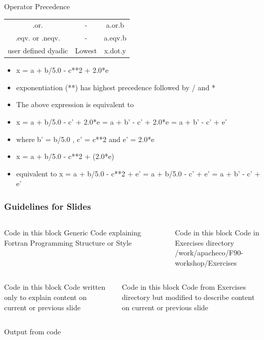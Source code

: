 \documentclass[slidestop,mathserif,compress,xcolor=svgnames]{beamer}
\newenvironment{bblock}[0]
{
\begin{beamerboxesrounded}[upper=uppercol1,lower=lowercol1,shadow=true]}
{\end{beamerboxesrounded}}
\newenvironment{eblock}[0]
{
\begin{beamerboxesrounded}[upper=uppercol2,lower=lowercol2,shadow=true]}
{\end{beamerboxesrounded}}
\newenvironment{beblock}[0]
{
\begin{beamerboxesrounded}[upper=uppercol3,lower=lowercol3,shadow=true]}
{\end{beamerboxesrounded}}
\newenvironment{eeblock}[0]
{
\begin{beamerboxesrounded}[upper=uppercol4,lower=lowercol4,shadow=true]}
{\end{beamerboxesrounded}}
\begin{document}
\begin{frame}[allowframebreaks]
\begin{block}{{\scriptsize Operator Precedence}}
\begin{center}
{\begin{tabular}{ccc}
        .or. & - & a.or.b \\
        .eqv. or .neqv. & - & a.eqv.b \\
        user defined dyadic & Lowest & x.dot.y\\
        \hline
      \end{tabular}
      }
    \end{center}
  \end{block}
  \begin{block}{}
    {\tiny
    \begin{itemize}
      \item x = a + b/5.0 - c**2 + 2.0*e
      \item[] exponentiation (**) has highest precedence followed by / and *
      \item The above expression is equivalent to
      \item x = a + b/5.0 - c' + 2.0*e = a + b' - c' + 2.0*e = a + b' - c' + e'
      \item[] where b' = b/5.0 , c' = c**2 and e' = 2.0*e
      \item x = a + b/5.0 - c**2 + (2.0*e)
      \item equivalent to x = a + b/5.0 - c**2 + e' = a + b/5.0 - c' + e' = a + b' - c' + e'
    \end{itemize}
    }
  \end{block}
\end{frame}

\begin{frame}
  \frametitle{\small Guidelines for Slides}
  \begin{columns}
    \column{5cm}
    \begin{block}{\scriptsize Code in this block}
      Generic Code explaining Fortran Programming Structure or Style
    \end{block}
    \column{5cm}
    \begin{eblock}{Code in this block}
      Code in Exercises directory\\
      /work/apacheco/F90-workshop/Exercises
    \end{eblock}
  \end{columns}
  \vspace{1cm}
  \begin{columns}
    \column{5cm}
    \begin{bblock}{Code in this block}
      Code written only to explain content on current or previous slide
    \end{bblock}
    \column{5cm}
    \begin{eeblock}{Code in this block}
      Code from Exercises directory but modified to describe content on current or previous slide
    \end{eeblock}
  \end{columns}
  \vspace{1cm}
  \begin{columns}
    \column{5cm}
    \begin{beblock}{}
      Output from code
    \end{beblock}
  \end{columns}
\end{frame}
\end{document}
